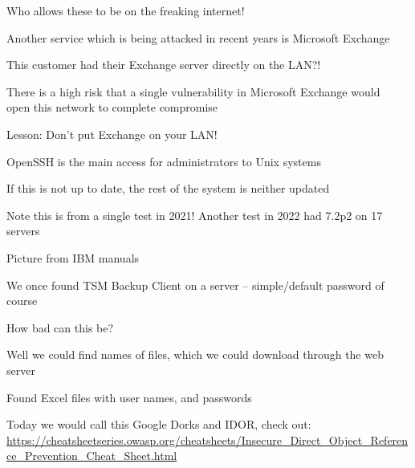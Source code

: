 \documentclass[Screen16to9,17pt]{foils}
\begin{document}
\begin{list2}
\item Who allows these to be on the freaking internet!
\end{list2}




Another service which is being attacked in recent years is Microsoft Exchange

This customer had their Exchange server directly on the LAN?!

\begin{list2}
\item There is a high risk that a single vulnerability in Microsoft Exchange would \\
open this network to complete compromise
\end{list2}




\begin{list2}
\item Lesson: Don't put Exchange on your LAN!
\end{list2}




\begin{list2}
\item OpenSSH is the main access for administrators to Unix systems
\item If this is not up to date, the rest of the system is neither updated
\item Note this is from a single test in 2021! Another test in 2022 had 7.2p2 on 17 servers
\end{list2}



Picture from IBM manuals

\begin{list2}
\item We once found TSM Backup Client on a server -- simple/default password of course
\item How bad can this be?
\item Well we could find names of files, which we could download through the web server
\item Found Excel files with user names, and passwords
\item Today we would call this Google Dorks and IDOR, check out:\\ {\footnotesize
\url{https://cheatsheetseries.owasp.org/cheatsheets/Insecure_Direct_Object_Reference_Prevention_Cheat_Sheet.html}}
\end{list2}
\end{document}
